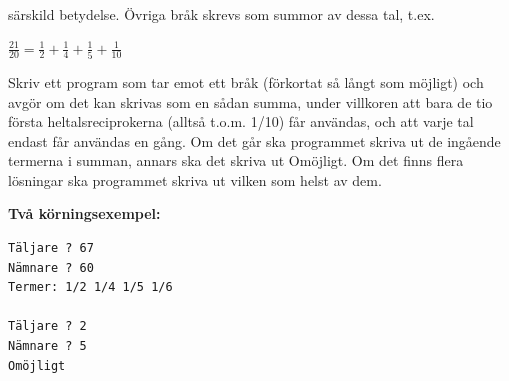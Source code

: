 \documentclass[a4paper,12pt]{article}
\begin{document}
särskild betydelse. Övriga bråk skrevs som summor av dessa tal, t.ex.

${\displaystyle {\frac {21}{20}}={\frac {1}{2}}+{\frac {1}{4}}+{\frac {1}{5}}+{\frac {1}{10}}}$

Skriv ett program som tar emot ett bråk (förkortat så långt som möjligt) och avgör om det kan skrivas som en sådan summa, under villkoren att bara de tio första heltalsreciprokerna (alltså t.o.m. 1/10) får användas, och att varje tal endast får användas en gång. Om det går ska programmet skriva ut de ingående termerna i summan, annars ska det skriva ut Omöjligt. Om det finns flera lösningar ska programmet skriva ut vilken som helst av dem.



\textbf{Två körningsexempel:}
\begin{lstlisting}
Täljare ? 67
Nämnare ? 60
Termer: 1/2 1/4 1/5 1/6

Täljare ? 2
Nämnare ? 5
Omöjligt
\end{lstlisting}
\end{document}
